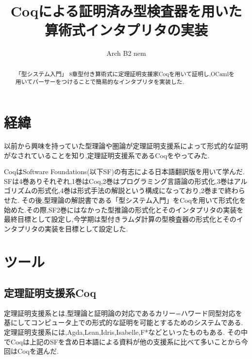 \documentclass[a4j,10pt,fleqn]{jsarticle}
\begin{document}

\title{Coqによる証明済み型検査器を用いた算術式インタプリタの実装}

\author{ Arch B2 nem }

\newcommand{\bnfdef}{::=}
\newcommand{\bs}{\boldsymbol}
\newlength{\len}
\settowidth{\len}{$\bnfdef$}
\newcommand{\bnfor}{\makebox[\len]{$|$}}


\begin{abstract}
  「型システム入門」\cite{TaPL} 8章型付き算術式に定理証明支援家Coqを用いて証明し,OCamlを用いてパーサーをつけることで簡易的なインタプリタを実装した.
\end{abstract}

\maketitle
\thispagestyle{empty}

\section{経緯}
以前から興味を持っていた型理論や圏論が定理証明支援系によって形式的な証明がなされていることを知り,定理証明支援系であるCoqをやってみた.\par
CoqはSoftware Foundations\cite{SF}(以下SF)の有志による日本語翻訳版\cite{sfja}を用いて学んだ. SFは4巻ありそれぞれ,1巻はCoq,2巻はプログラミング言語論の形式化,3巻はアルゴリズムの形式化,4巻は形式手法の解説という構成になっており,2巻まで終わらせた. その後,型理論の解説書である「型システム入門」をCoqを用いて形式化を始めた.その際,SF2巻にはなかった型推論の形式化とそのインタプリタの実装を最終目標として設定し,今学期は型付きラムダ計算の型検査器の形式化とそのインタプリタの実装を目標として設定した.\par

\section{ツール}
\subsection{定理証明支援系Coq}
定理証明支援系とは,型理論と証明論の対応であるカリー=ハワード同型対応を基にしてコンピュータ上での形式的な証明を可能とするためのシステムである. 定理証明支援系には,Agda,Lean,Idris,Isabelle,F*などといったものもある. その中でCoqは上記のSFを含め日本語による資料が他の支援系に比べて多いことから今回はCoqを選んだ. \par
\end{document}
